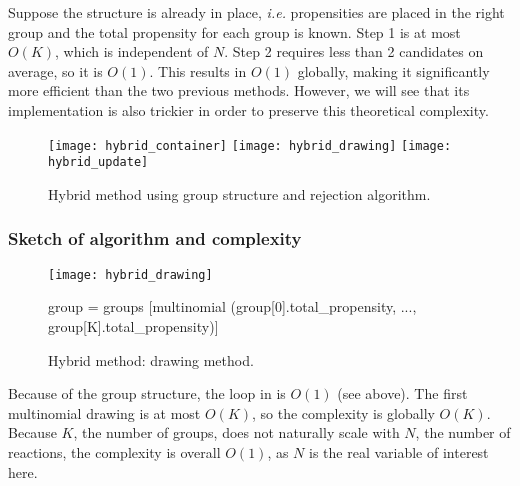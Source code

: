 Suppose the structure is already in place, \textit{i.e.} propensities are placed in the right group and the total propensity for each group is known. Step 1 is at most $O(K)$, which is independent of $N$. Step 2 requires less than 2 candidates on average, so it is $O(1)$. This results in $O(1)$ globally, making it significantly more efficient than the two previous methods. However, we will see that its implementation is also trickier in order to preserve this theoretical complexity.

\begin{figure}[!h]
  \centering
  \texttt{[image: hybrid\_container]}
  \texttt{[image: hybrid\_drawing]}
  \texttt{[image: hybrid\_update]}
  \caption {Hybrid method using group structure and rejection algorithm.}
  \label {fig:hybrid_method}
\end {figure}

\subsubsection {Sketch of algorithm and complexity} 

\begin{figure}[!h]
  \centering
  \begin{minipage}{\textwidth}
    \centering
    \texttt{[image: hybrid\_drawing]}
    \begin{algorithm}[H]
      \SetAlgoLined
      \KwData{$K+1$ groups, group k containing propensities whose value falls in the interval $(0,b]$ if k=0, $(2^{k-1}b, 2^kb]$ if k $>$ 0. Propensities are stored as a couple containing their value and original index.}
      group = groups [multinomial (group[0].total\_propensity, ..., 
        group[K].total\_propensity)]\;
    \end{algorithm}
  \end{minipage}
  \caption{Hybrid method: drawing method.}
  \label{fig:hybrid_drawing}
\end{figure}

Because of the group structure, the loop in  is $O(1)$ (see above). The first multinomial drawing is at most $O(K)$, so the complexity is globally $O(K)$. Because $K$, the number of groups, does not naturally scale with $N$, the number of reactions, the complexity is overall $O(1)$, as $N$ is the real variable of interest here.


